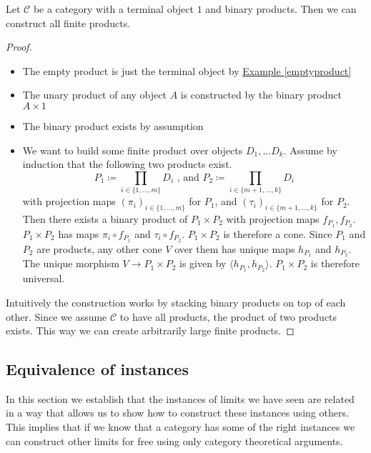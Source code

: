\begin{lemma}
  \label{finiteproducts}
  Let $\mathscr C$ be a category with a terminal object $1$ and binary products.
  Then we can construct all finite products.
\end{lemma}
\begin{proof}
  \begin{itemize}
  \item The empty product is just the terminal object by
    \hyperref[emptyproduct]{Example \ref*{emptyproduct}}
  \item The unary product of any object $A$ is constructed by the binary product
    $A\times 1$ %
  \item The binary product exists by assumption
  \item We want to build some finite product over objects $D_1, \dots D_k$.
    Assume by induction that the following two products exist.
    \[ P_1 \coloneqq \displaystyle \prod_{i \in \{1, \dots, m \} } D_i \text{ , and } P_2 \coloneqq \displaystyle \prod_{i \in \{m+1, \dots, k\} } D_i \]
    with projection maps $(\pi_i)_{i \in \{1, \dots, m \} }$ for $P_1$, and $(\tau_i)_{i \in \{m+1, \dots, k\} }$ for $P_2$.
    Then there exists a binary product of $P_1 \times P_2$ with projection maps $f_{P_1}, f_{P_2}$.
    $P_1 \times P_2$ has maps $\pi_i \circ f_{P_1}$ and $\tau_i \circ f_{P_2}$.
    $P_1 \times P_2$ is therefore a cone.
    Since $P_1$ and $P_2$ are products, any other cone $V$ over them has unique maps $h_{P_1}$ and $h_{P_2}$.
    The unique morphism $V \rightarrow P_1 \times P_2$ is given by $\langle h_{P_1}, h_{P_2} \rangle$.
    $P_1 \times P_2$ is therefore universal.
  \end{itemize}
  Intuitively the construction works by stacking binary products on top of each other.
  Since we assume $\mathscr C$ to have all products, the product of two products exists. This way we can create
  arbitrarily large finite products.
\end{proof}

\subsection{Equivalence of instances}
\label{equiinstance}

In this section we establish that the instances of limits we have seen are related
in a way that allows us to show how to construct these instances using others.
This implies that if we know that a category has some of the right instances
we can construct other limits for free using only category theoretical arguments.

